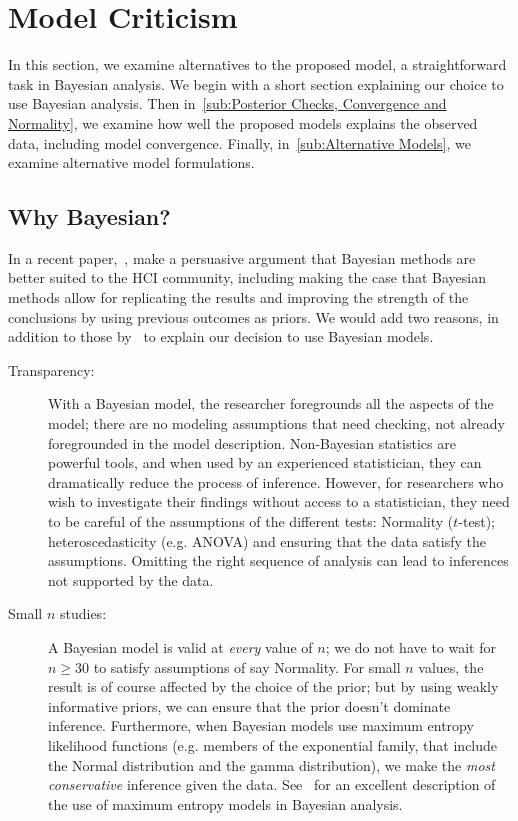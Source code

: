 
\section{Model Criticism}
\label{sec:Model Criticism}

In this section, we examine alternatives to the proposed model, a straightforward task in Bayesian analysis. We begin with a short section explaining our choice to use Bayesian analysis. Then in~\ref{sub:Posterior Checks, Convergence and Normality}, we examine how well the proposed models explains the observed data, including model convergence. Finally, in~\ref{sub:Alternative Models}, we examine alternative model formulations.

\subsection{Why Bayesian?}
\label{sub:Why Bayesian?}
In a recent paper,~\textcite{Kay2016}, make a persuasive argument that Bayesian methods are better suited to the HCI community, including making the case that Bayesian methods allow for replicating the results and improving the strength  of the conclusions by using previous outcomes as priors. We would add two reasons, in addition to those by~\textcite{Kay2016} to explain our decision to use Bayesian models. 
\begin{description}
    \item[Transparency:] With a Bayesian model, the researcher foregrounds all the aspects of the model; there are no modeling assumptions that need checking, not already foregrounded in the model description. Non-Bayesian statistics are powerful tools, and when used by an experienced statistician, they can dramatically reduce the process of inference. However, for researchers who wish to investigate their findings without access to a statistician, they need to be careful of the assumptions of the different tests: Normality ($t$-test); heteroscedasticity (e.g. ANOVA) and ensuring that the data satisfy the assumptions. Omitting the right sequence of analysis can lead to inferences not supported by the data.
    \item[Small $n$ studies:] A Bayesian model is valid at \textit{every} value of $n$; we do not have to wait for $n\geq 30$ to satisfy assumptions of say Normality. For small $n$ values, the result is of course affected by the choice of the prior; but by using weakly informative priors, we can ensure that the prior doesn't dominate inference. Furthermore, when Bayesian models use maximum entropy likelihood functions (e.g. members of the exponential family, that include the Normal distribution and the gamma distribution), we make the \textit{most conservative} inference given the data. See~\textcite[][Chapter 9]{McElreath2015} for an excellent description of the use of maximum entropy models in Bayesian analysis.
\end{description}


